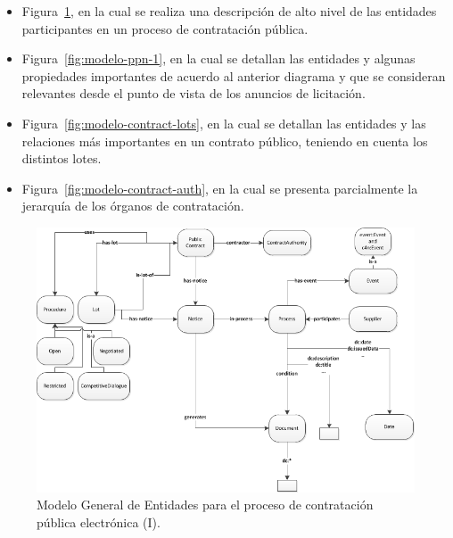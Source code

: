 \begin{itemize}
 \item Figura~\ref{fig:modelo-ppn}, en la cual se realiza una descripción de alto nivel de las entidades 
participantes en un proceso de contratación pública.
 \item Figura~\ref{fig:modelo-ppn-1}, en la cual se detallan las entidades y algunas propiedades importantes 
de acuerdo al anterior diagrama y que se consideran relevantes desde el punto de vista de los anuncios 
de licitación.
\item Figura~\ref{fig:modelo-contract-lots}, en la cual se detallan las entidades y las relaciones más importantes 
en un contrato público, teniendo en cuenta los distintos lotes.
\item Figura~\ref{fig:modelo-contract-auth}, en la cual se presenta parcialmente la jerarquía de los órganos 
de contratación.
\end{itemize}
 

\begin{figure}[!htp]
    \centering
	\includegraphics[width=16cm]{images/phd/modelo/eProc-general}
	\caption{Modelo General de Entidades para el proceso de contratación pública electrónica (I).}
	\label{fig:modelo-ppn}
\end{figure}


